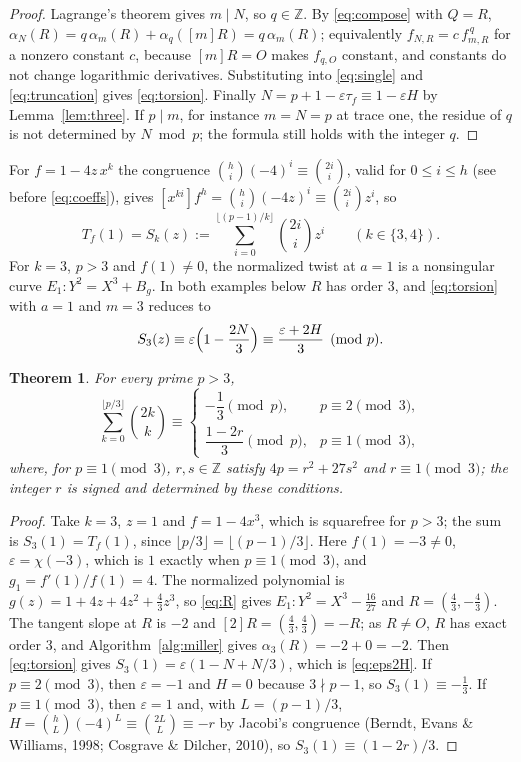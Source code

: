 \documentclass[11pt,a4paper]{article}
\numberwithin{equation}{section}
\theoremstyle{plain}
\newtheorem{theorem}{Theorem}[section]
\theoremstyle{definition}
\newcommand{\eps}{\varepsilon}
\begin{document}
\begin{proof}
Lagrange's theorem gives $m\mid N$, so $q\in\mathbb Z$. By \eqref{eq:compose} with $Q=R$, $\alpha_N(R)=q\,\alpha_m(R)+\alpha_q([m]R)=q\,\alpha_m(R)$; equivalently $f_{N,R}=c\,f_{m,R}^{\,q}$ for a nonzero constant $c$, because $[m]R=O$ makes $f_{q,O}$ constant, and constants do not change logarithmic derivatives. Substituting into \eqref{eq:single} and \eqref{eq:truncation} gives \eqref{eq:torsion}. Finally $N=p+1-\eps\tau_f\equiv1-\eps H$ by Lemma~\ref{lem:three}. If $p\mid m$, for instance $m=N=p$ at trace one, the residue of $q$ is not determined by $N\bmod p$; the formula still holds with the integer $q$.
\end{proof}

For $f=1-4z\,x^k$ the congruence $\binom{h}{i}(-4)^i\equiv\binom{2i}{i}$, valid for $0\le i\le h$ (see before \eqref{eq:coeffs}), gives $[x^{ki}]f^h=\binom{h}{i}(-4z)^i\equiv\binom{2i}{i}z^i$, so
\[
T_f(1)=S_k(z):=\sum_{i=0}^{\lfloor(p-1)/k\rfloor}\binom{2i}{i}z^i\qquad(k\in\{3,4\}).
\]
For $k=3$, $p>3$ and $f(1)\neq0$, the normalized twist at $a=1$ is a nonsingular curve $E_1:Y^2=X^3+B_g$. In both examples below $R$ has order $3$, and \eqref{eq:torsion} with $a=1$ and $m=3$ reduces to
\begin{equation}\label{eq:eps2H}
S_3(z)\equiv\eps\Bigl(1-\frac{2N}{3}\Bigr)\equiv\frac{\eps+2H}{3}\pmod p .
\end{equation}

\begin{theorem}\label{thm:third-sum}
For every prime $p>3$,
\[
\sum_{k=0}^{\lfloor p/3\rfloor}\binom{2k}{k}\equiv
\begin{cases}
-\dfrac13\pmod p, & p\equiv2\pmod3,\\[2mm]
\dfrac{1-2r}{3}\pmod p, & p\equiv1\pmod3,
\end{cases}
\]
where, for $p\equiv1\pmod3$, $r,s\in\mathbb Z$ satisfy $4p=r^2+27s^2$ and $r\equiv1\pmod3$; the integer $r$ is signed and determined by these conditions.
\end{theorem}

\begin{proof}
Take $k=3$, $z=1$ and $f=1-4x^3$, which is squarefree for $p>3$; the sum is $S_3(1)=T_f(1)$, since $\lfloor p/3\rfloor=\lfloor(p-1)/3\rfloor$. Here $f(1)=-3\neq0$, $\eps=\chi(-3)$, which is $1$ exactly when $p\equiv1\pmod3$, and $g_1=f'(1)/f(1)=4$. The normalized polynomial is $g(z)=1+4z+4z^2+\tfrac43z^3$, so \eqref{eq:R} gives $E_1:Y^2=X^3-\tfrac{16}{27}$ and $R=(\tfrac43,-\tfrac43)$. The tangent slope at $R$ is $-2$ and $[2]R=(\tfrac43,\tfrac43)=-R$; as $R\neq O$, $R$ has exact order $3$, and Algorithm~\ref{alg:miller} gives $\alpha_3(R)=-2+0=-2$. Then \eqref{eq:torsion} gives $S_3(1)=\eps(1-N+N/3)$, which is \eqref{eq:eps2H}. If $p\equiv2\pmod3$, then $\eps=-1$ and $H=0$ because $3\nmid p-1$, so $S_3(1)\equiv-\tfrac13$. If $p\equiv1\pmod3$, then $\eps=1$ and, with $L=(p-1)/3$, $H=\binom{h}{L}(-4)^L\equiv\binom{2L}{L}\equiv-r$ by Jacobi's congruence (Berndt, Evans \& Williams, 1998; Cosgrave \& Dilcher, 2010), so $S_3(1)\equiv(1-2r)/3$.
\end{proof}
\end{document}
